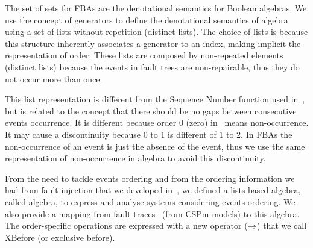 \documentclass[en,twoside,onehalfspacing,phd]{risethesis}
\def\xbeforeop{\ensuremath\rightarrow}
\begin{document}
The set of sets for \acp{FBA} are the denotational semantics for Boolean algebras.
We use the concept of generators to define the denotational semantics of \ac{algebra} using a set of lists without repetition (distinct lists).
The choice of lists is because this structure inherently associates a generator to an index, making implicit the representation of order.
These lists are composed by non-repeated elements (distinct lists) because the events in fault trees are non-repairable, thus they do not occur more than once.

This list representation is different from the Sequence Number function used in~\cite{WP2009,Walker2009}, but is related to the concept that there should be no gaps between consecutive events occurrence.
It is different because order 0 (zero) in~\cite{WP2009,Walker2009} means non-occurrence.
It may cause a discontinuity because 0 to 1 is different of 1 to 2.
In \acp{FBA} the non-occurrence of an event is just the absence of the event, thus we use the same representation of non-occurrence in \ac{algebra} to avoid this discontinuity.




From the need to tackle events ordering and from the ordering information we had from fault injection that we developed in~\cite{DM2012}, we defined a lists-based algebra, called \ac{algebra}, to express and analyse systems considering events ordering.
We also provide a mapping from fault traces~\cite{DM2012} (from \ac{CSPm} models) to this algebra.
The order-specific operations are expressed with a new operator ($\xbeforeop$) that we call XBefore (or exclusive before).

\end{document}
